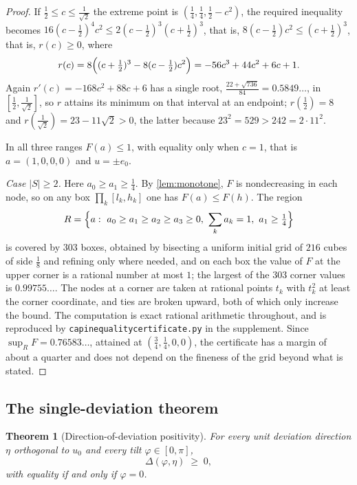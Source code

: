 \documentclass[11pt,reqno]{amsart}
\renewcommand{\_}{\origunderscore\allowbreak}
\numberwithin{equation}{section}
\theoremstyle{plain}
\newtheorem{thm}{Theorem}[section]
\theoremstyle{definition}
\theoremstyle{remark}
\newcommand{\tilt}{\varphi}                  %
\newcommand{\dev}{\eta}                      %
\newcommand{\defect}{\Delta}                 %
\newcommand{\base}{u}                        %
\begin{document}
\begin{proof}
If $\tfrac12\le c\le\tfrac{1}{\sqrt2}$ the extreme point is
$(\tfrac14,\tfrac14,\tfrac12-c^2)$, the required inequality becomes
$16(c-\tfrac12)^4c^2\le2(c-\tfrac12)^3(c+\tfrac12)^3$, that is,
$8(c-\tfrac12)c^2\le(c+\tfrac12)^3$, that is, $r(c)\ge0$, where
\[
  r(c)=8\Bigl((c+\tfrac12)^3-8(c-\tfrac12)c^2\Bigr)=-56c^3+44c^2+6c+1 .
\]
Again $r'(c)=-168c^2+88c+6$ has a single root,
$\tfrac{22+\sqrt{736}}{84}=0.5849\ldots$, in $[\tfrac12,\tfrac1{\sqrt2}]$,
so $r$ attains its minimum on that interval at an endpoint; $r(\tfrac12)=8$
and $r(\tfrac1{\sqrt2})=23-11\sqrt2>0$, the latter because
$23^2=529>242=2\cdot11^2$.

In all three ranges $F(a)\le1$, with equality only when $c=1$, that is
$a=(1,0,0,0)$ and $u=\pm e_0$.

\emph{Case $|S|\ge2$.} Here $a_0\ge a_1\ge\tfrac14$. By
\cref{lem:monotone}, $F$ is nondecreasing in each node, so on any box
$\prod_k[l_k,h_k]$ one has $F(a)\le F(h)$. The region
\[
  R=\Bigl\{a:\ a_0\ge a_1\ge a_2\ge a_3\ge0,\ \sum_ka_k=1,\ a_1\ge\tfrac14\Bigr\}
\]
is covered by $303$ boxes, obtained by bisecting a uniform initial grid of
$216$ cubes of side $\tfrac18$ and refining only where needed, and on each
box the value of $F$ at the upper corner is a rational number at most $1$;
the largest of the $303$ corner values is $0.99755\ldots$. The nodes at a corner
are taken at rational points $t_k$ with $t_k^2$ at least the corner
coordinate, and ties are broken upward, both of which only increase the
bound. The computation is exact rational arithmetic throughout, and is
reproduced by \texttt{cap\_inequality\_certificate.py} in the supplement.
Since $\sup_R F=0.76583\ldots$, attained at $(\tfrac34,\tfrac14,0,0)$, the
certificate has a margin of about a quarter and does not depend on the
fineness of the grid beyond what is stated.
\end{proof}

\subsection{The single-deviation theorem}\label{sec:single-dev-theorem}

\begin{thm}[Direction-of-deviation positivity]\label{thm:eperp-closed}
For every unit deviation direction $\dev$ orthogonal to $\base_0$ and
every tilt $\tilt\in[0,\pi]$,
\[
  \defect(\tilt,\dev)\;\ge\;0,
\]
with equality if and only if $\tilt=0$.
\end{thm}
\end{document}
